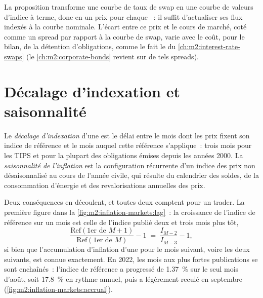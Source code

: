 La proposition transforme une courbe de taux de swap en une courbe de valeurs d'indice
à terme, donc en un prix pour chaque ~: il suffit d'actualiser ses flux indexés
à la courbe nominale. L'écart entre ce prix et le cours de marché, coté
comme un spread par rapport à la courbe de swap, varie avec le coût, pour le bilan, de la détention
d'obligations, comme le fait le  du \cref{ch:m2:interest-rate-swaps}
(le \cref{ch:m2:corporate-bonds} revient sur de tels spreads).

\section{Décalage d'indexation et saisonnalité}

\begin{definition}\label{def:m2:inflation-markets:lag}
Le \emph{décalage d'indexation} d'une  est le délai entre
le mois dont les prix fixent son indice de référence et le mois auquel cette
référence s'applique~: trois mois pour les TIPS et pour la plupart des obligations émises depuis
les années 2000. La \emph{saisonnalité de l'inflation} est la configuration récurrente
d'un indice des prix non désaisonnalisé au cours de l'année civile, qui résulte du calendrier
des soldes, de la consommation d'énergie et des revalorisations annuelles des prix.
\end{definition}

Deux conséquences en découlent, et toutes deux comptent pour un trader. La première figure dans la
\cref{fig:m2:inflation-markets:lag}~: la croissance de l'indice de référence sur un mois est celle
de l'indice publié deux et trois mois plus tôt,
\begin{equation}\label{eq:m2:inflation-markets:accrual}
\frac{\mathrm{Ref}(\text{1er de } M+1)}{\mathrm{Ref}(\text{1er de } M)} - 1 \;=\; \frac{I_{M-2}}{I_{M-3}} - 1,
\end{equation}
si bien que l'accumulation d'inflation d'une  pour le mois suivant, voire les deux suivants, est connue exactement. En
2022, les mois aux plus fortes publications se sont enchaînés~: l'indice de référence
a progressé de 1.37~\% sur le seul mois d'août, soit 17.8~\% en rythme annuel, puis a légèrement
reculé en septembre (\cref{fig:m2:inflation-markets:accrual}).

